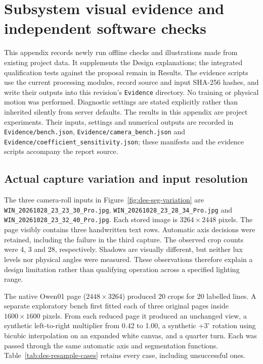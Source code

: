 \section{Subsystem visual evidence and independent software checks}
\label{app:des-visual-tests}
This appendix records newly run offline checks and illustrations made from existing project data. It supplements the Design explanations; the integrated qualification tests against the proposal remain in Results. The evidence scripts use the current processing modules, record source and input SHA-256 hashes, and write their outputs into this revision's \texttt{Evidence} directory. No training or physical motion was performed. Diagnostic settings are stated explicitly rather than inherited silently from server defaults. The results in this appendix are project experiments. Their inputs, settings and numerical outputs are recorded in \texttt{Evidence/bench.json}, \texttt{Evidence/camera\_bench.json} and \texttt{Evidence/coefficient\_sensitivity.json}; these manifests and the evidence scripts accompany the report source.


\subsection{Actual capture variation and input resolution}
The three camera-roll inputs in Figure~\ref{fig:des-seg-variation} are \texttt{WIN\_20261028\_23\_23\_30\_Pro.jpg}, \texttt{WIN\_20261028\_23\_28\_34\_Pro.jpg} and \texttt{WIN\_20261028\_23\_32\_40\_Pro.jpg}. Each stored image is $3264\times2448$ pixels. The page visibly contains three handwritten text rows. Automatic axis decisions were retained, including the failure in the third capture. The observed crop counts were 4, 3 and 28, respectively. Shadows are visually different, but neither lux levels nor physical angles were measured. These observations therefore explain a design limitation rather than qualifying operation across a specified lighting range.


The native Owen01 page ($2448\times3264$) produced 20 crops for 20 labelled lines. A separate exploratory bench first fitted each of three original pages inside $1600\times1600$ pixels. From each reduced page it produced an unchanged view, a synthetic left-to-right multiplier from 0.42 to 1.00, a synthetic $+3^\circ$ rotation using bicubic interpolation on an expanded white canvas, and a quarter turn. Each was passed through the same automatic axis and segmentation functions. Table~\ref{tab:des-resample-cases} retains every case, including unsuccessful ones.


